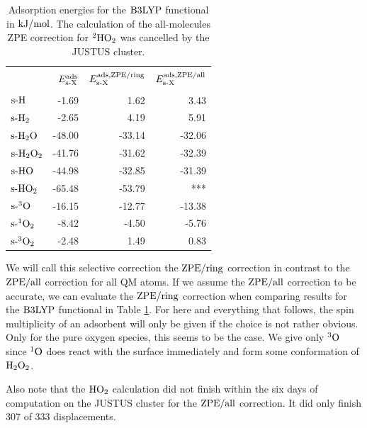 \documentclass[8.5pt,twoside,twocolumn]{article}
\newcommand\eads{\enmat{E^{\te{ads}}}}
\newcommand\sur{\enmat{\te{s-}}}
\newcommand\kmo{\enmat{\te {kJ/mol}}}
\theoremstyle{standard}
\begin{document}
\renewcommand\eads[1]{E_{\sur\te X}^{\te{ads}{#1}}}
\begin{table}[t]
  \caption{Adsorption energies for the $\text{B3LYP}$ functional in $\kmo$. The calculation
  of the all-molecules ZPE correction for $^2\text H \text O_2$ was cancelled by the JUSTUS cluster.}
  \centering
\begin{tabular}{l | r|r|r|}
& & & \\[-10pt]
    & \ph{$^{\zpeall}$}$\eads{}$ & $\eads{,\zpering}$ & $\eads{,\zpeall}$ \\[2pt]
    \hline
       & & & \\[-10pt]
    $\sur\te H$ & -1.69 & 1.62  & 3.43 \\
    $\sur\te H_2$ & -2.65 & 4.19  & 5.91 \\
    $\sur\hto$ & -48.00 & -33.14 & -32.06 \\
    $\sur\htot$ & -41.76 & -31.62 & -32.39 \\
    $\sur\te{HO}$ & -44.98 & -32.85 & -31.39 \\
    $\sur\te{HO}_2$ & -65.48 & -53.79 & *** \\
    $\sur^3\te O$ & -16.15 & -12.77 & -13.38 \\
    $\sur^1\te O_2$ & -8.42 & -4.50 & -5.76 \\
    $\sur^3\te O_2$ & -2.48 & 1.49  & 0.83 \\[2pt]
    \hline
    \end{tabular}
  \label{Tab:Ads:AdsB3lyp}%
\end{table}%


We will call this selective correction the $\text{ZPE}/\text{ring}$ correction in contrast to
the $\text{ZPE}/\text{all}$ correction for all QM atoms. If we assume the $\text{ZPE}/\text{all}$ correction 
to be accurate, we can evaluate the $\text{ZPE}/\text{ring}$ correction when comparing
results for the $\text{B3LYP}$ functional in Table \ref{Tab:Ads:AdsB3lyp}. For here
and everything that follows, the spin multiplicity of an adsorbent will only
be given if the choice is not rather obvious. Only for the pure oxygen species,
this seems to be the case. We give only $^3\text O$ since $^1\text O$ does react with the surface
immediately and form some conformation of $\text H _2 \text O_2$.

Also note that the $\text H \text O_2$ calculation did not finish within the six days
of computation on the JUSTUS cluster for the $\text{ZPE}/\text{all}$ correction. It did
only finish 307 of 333 displacements.  
\end{document}
